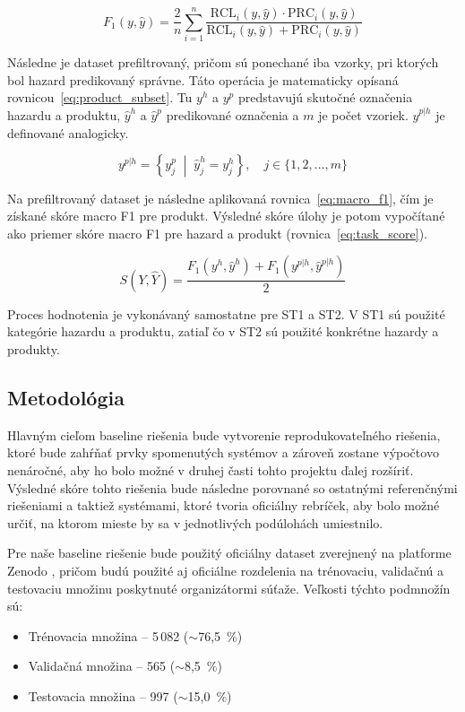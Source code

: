 \begin{equation}
  F_1(y, \hat{y}) = \frac{2}{n} \sum_{i=1}^{n} \frac{\mathrm{RCL}_i(y, \hat{y}) \cdot \mathrm{PRC}_i(y, \hat{y})}{\mathrm{RCL}_i(y, \hat{y}) + \mathrm{PRC}_i(y, \hat{y})}
  \label{eq:macro_f1}
\end{equation}


Následne je dataset prefiltrovaný, pričom sú ponechané iba vzorky, pri ktorých bol hazard predikovaný správne. Táto operácia je matematicky opísaná rovnicou~\ref{eq:product_subset}. Tu $y^h$ a $y^p$ predstavujú skutočné označenia hazardu a produktu, $\hat{y}^h$ a $\hat{y}^p$ predikované označenia a $m$ je počet vzoriek. $\hat{y}^{p|h}$ je definované analogicky.

\begin{equation}
  y^{p|h} = \left\{ y^p_j \;\middle|\; \hat{y}^h_j = y^h_j \right\}, \quad j \in \{1, 2, \dots, m\}
  \label{eq:product_subset}
\end{equation}

Na prefiltrovaný dataset je následne aplikovaná rovnica~\ref{eq:macro_f1}, čím je získané skóre macro F1 pre produkt. Výsledné skóre úlohy je potom vypočítané ako priemer skóre macro F1 pre hazard a produkt (rovnica~\ref{eq:task_score}).

\begin{equation}
  S(Y, \hat{Y}) = \frac{F_1(y^h, \hat{y}^h) + F_1(y^{p|h}, \hat{y}^{p|h})}{2}
  \label{eq:task_score}
\end{equation}

Proces hodnotenia je vykonávaný samostatne pre ST1 a ST2. V ST1 sú použité kategórie hazardu a produktu, zatiaľ čo v ST2 sú použité konkrétne hazardy a produkty.

\subsection{Metodológia}

Hlavným cieľom baseline riešenia bude vytvorenie reprodukovateľného riešenia, ktoré bude zahŕňať prvky spomenutých systémov a zároveň zostane výpočtovo nenáročné, aby ho bolo možné v druhej časti tohto projektu ďalej rozšíriť. Výsledné skóre tohto riešenia bude následne porovnané so ostatnými referenčnými riešeniami a taktiež systémami, ktoré tvoria oficiálny rebríček, aby bolo možné určiť, na ktorom mieste by sa v jednotlivých podúlohách umiestnilo.

Pre naše baseline riešenie bude použitý oficiálny dataset zverejnený na platforme Zenodo \cite{randl_2025_15007331}, pričom budú použité aj oficiálne rozdelenia na trénovaciu, validačnú a testovaciu množinu poskytnuté organizátormi súťaže. Veľkosti týchto podmnožín sú:

\begin{itemize}
    \item Trénovacia množina -- 5\,082 ($\sim$76,5~\%)
    \item Validačná množina -- 565 ($\sim$8,5~\%)
    \item Testovacia množina -- 997 ($\sim$15,0~\%)
\end{itemize}